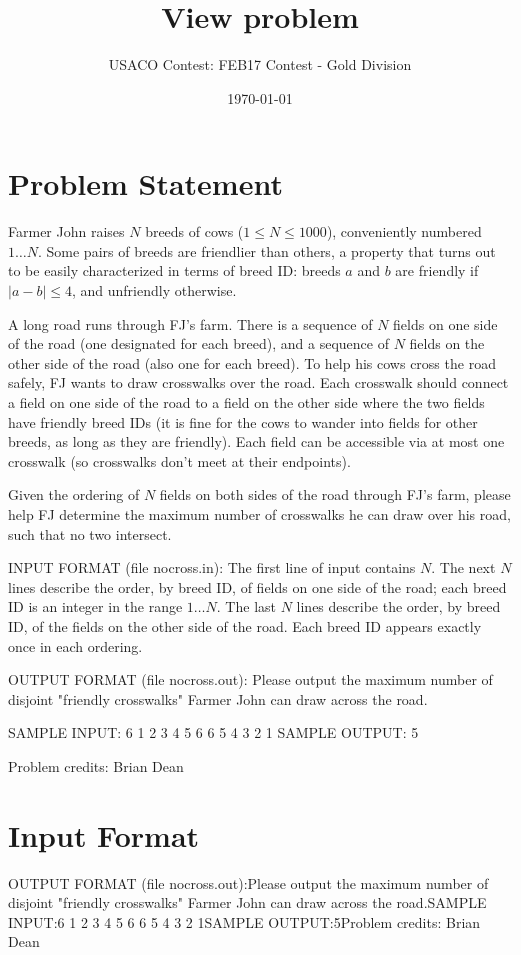 \documentclass[12pt]{article}
\title{View problem}
\author{USACO Contest: FEB17 Contest - Gold Division}
\date{\today}
\begin{document}
\maketitle

\section*{Problem Statement}

Farmer John raises $N$ breeds of cows ($1 \leq N \leq 1000$), conveniently
numbered $1 \ldots N$.  Some pairs of breeds are friendlier than others, a
property that turns out to be easily characterized in terms of breed ID: breeds
$a$ and $b$ are friendly if $|a - b| \leq 4$, and unfriendly otherwise.

A long road runs through FJ's farm.  There is a sequence of $N$ fields on
one side of the road (one designated for each breed), and a sequence of $N$ fields on the
other side of the road (also one for each breed).  To help his cows cross
the road safely, FJ wants to draw crosswalks over the road.  Each crosswalk
should connect a field on one side of the road to a field on the other side
where the two fields have friendly breed IDs (it is fine for the cows to wander
into fields for other breeds, as long as they are friendly).
Each field can be accessible
via at most one crosswalk (so crosswalks don't meet at their endpoints).

Given the ordering of $N$ fields on both sides of the road through FJ's farm,
please help FJ
determine the maximum number of crosswalks he can draw over his road, such that
no two intersect.

INPUT FORMAT (file nocross.in):
The first line of input contains $N$.  The next $N$
lines describe the order, by breed ID, of fields on one side of the road; each
breed ID is an integer in the range $1 \ldots N$.  The last $N$ lines describe
the order, by  breed ID, of the fields on the other side of the road.  Each
breed ID appears exactly once in each ordering.

OUTPUT FORMAT (file nocross.out):
Please output the maximum number of disjoint "friendly crosswalks" Farmer John
can draw across the road.

SAMPLE INPUT:
6
1
2
3
4
5
6
6
5
4
3
2
1
SAMPLE OUTPUT: 
5

Problem credits: Brian Dean



\section*{Input Format}
OUTPUT FORMAT (file nocross.out):Please output the maximum number of disjoint "friendly crosswalks" Farmer John
can draw across the road.SAMPLE INPUT:6
1
2
3
4
5
6
6
5
4
3
2
1SAMPLE OUTPUT:5Problem credits: Brian Dean
\end{document}

